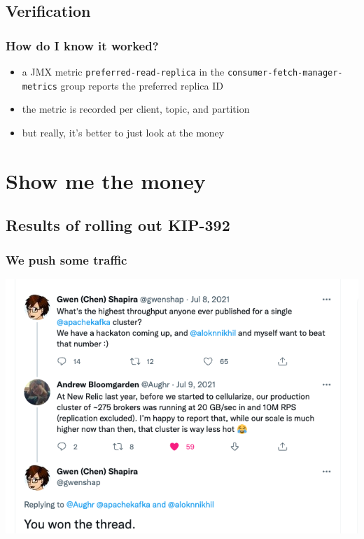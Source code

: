 \documentclass{beamer}
\newlength{\wideitemsep}
\let\olditem\item
\renewcommand{\item}{\setlength{\itemsep}{\wideitemsep}\olditem}
\begin{document}
\subsection{Verification}

\begin{frame}
  \frametitle{How do I know it worked?}

  \begin{itemize}
  \item a \alert{JMX metric} \texttt{preferred-read-replica} in the \texttt{consumer-fetch-manager-metrics} group reports the preferred replica ID
  \item the metric is recorded per client, topic, and partition
  \item but really, it's better to just look at the \alert{money}
  \end{itemize}
\end{frame}

\section{Show me the money}
\subsection{Results of rolling out KIP-392}

\begin{frame}
  \frametitle{We push some traffic}

  \begin{center}
    \includegraphics[keepaspectratio,width=\textwidth,height=0.8\textheight]{twitter.png}
  \end{center}
\end{frame}
\end{document}
